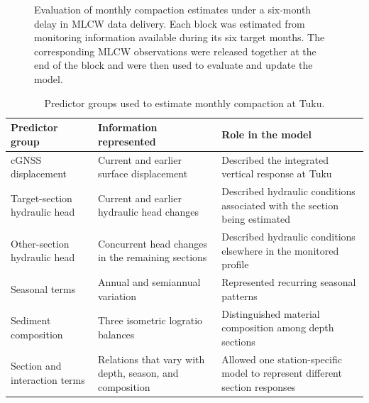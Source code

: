 \begin{figure}[htbp]
  \centering
  \caption{Evaluation of monthly compaction estimates under a six-month delay in MLCW data delivery. Each block was estimated from monitoring information available during its six target months. The corresponding MLCW observations were released together at the end of the block and were then used to evaluate and update the model.}
  \label{fig:delayed_observation_design}
\end{figure}

\begin{table}[htbp]
  \centering
  \small
  \renewcommand{\arraystretch}{1.15}
  \caption{Predictor groups used to estimate monthly compaction at Tuku.}
  \label{tab:predictor_summary}
  \begin{tabularx}{\textwidth}{@{}p{}p{}X@{}}
    \toprule
    \textbf{Predictor group} & \textbf{Information represented} & \textbf{Role in the model} \\
    \midrule
    cGNSS displacement & Current and earlier surface displacement & Described the integrated vertical response at Tuku \\
    Target-section hydraulic head & Current and earlier hydraulic head changes & Described hydraulic conditions associated with the section being estimated \\
    Other-section hydraulic head & Concurrent head changes in the remaining sections & Described hydraulic conditions elsewhere in the monitored profile \\
    Seasonal terms & Annual and semiannual variation & Represented recurring seasonal patterns \\
    Sediment composition & Three isometric logratio balances & Distinguished material composition among depth sections \\
    Section and interaction terms & Relations that vary with depth, season, and composition & Allowed one station-specific model to represent different section responses \\
    \bottomrule
  \end{tabularx}
\end{table}

\FloatBarrier
